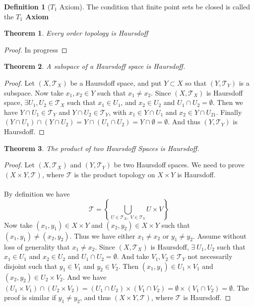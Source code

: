 \documentclass{article}
\newtheorem{theorem}{Theorem}[section]
\theoremstyle{remark}
\theoremstyle{definition}
\newtheorem{definition}{Definition}[section]
\begin{document}
\begin{definition}[$T_1$ Axiom]
The condition that finite point sets be closed is called the \textbf{$T_1$ Axiom}

\end{definition}

\begin{theorem}
Every order topology is Haursdoff
\end{theorem}

\begin{proof}
In progress
\end{proof}

\begin{theorem}
A subspace of a Haursdoff space is Haursdoff.
\end{theorem}

\begin{proof}
Let $(X, \mathcal{T}_X)$ be a Haursdoff space, and put $Y \subset X$ so that $(Y, \mathcal{T}_Y)$ is a subspace. Now take $x_1, x_2 \in Y$ such that $x_1 \neq x_2$. Since $(X, \mathcal{T}_X)$ is Haursdoff space, $\exists U_1, U_2 \in \mathcal{T}_X$ such that $x_1 \in U_1$, and $x_2 \in U_2$ and $U_1 \cap U_2 = \emptyset$. Then we have $Y \cap U_1 \in \mathcal{T}_Y$ and $Y \cap U_2 \in \mathcal{T}_Y$, with $x_1 \in Y \cap U_1$ and $x_2 \in Y \cap U_21$. Finally $( Y \cap U_1) \cap (Y \cap U_2) = Y \cap (U_1 \cap U_2) = Y \cap \emptyset = \emptyset$. And thus $(Y, \mathcal{T}_Y)$ is Haursdoff.
\end{proof}

\medskip

\begin{theorem}
The product of two Haursdoff Spaces is Haursdoff.
\end{theorem}

\begin{proof}
Let $(X, \mathcal{T}_X)$ and $(Y, \mathcal{T}_Y)$ be two Haursdoff spaces. We need to prove $(X \times Y, \mathcal{T})$, where $\mathcal{T}$ is the product topology on $X \times Y$ is Haursdoff. \\ \\ By definition we have $$\mathcal{T} = \left\{\bigcup_{U \in \mathcal{T}_X, \ V \in \mathcal{T}_Y} U \times V \right\}$$ Now take $(x_1, y_1) \in X \times Y$ and $(x_2, y_2) \in X \times Y$ such that $(x_1, y_1) \neq (x_2, y_2)$. Thus we have either $x_1 \neq x_2$ or $y_1 \neq y_2$. Assume without loss of generality that $x_1 \neq x_2$. Since $(X, \mathcal{T}_X)$ is Haursdoff, $\exists \ U_1, U_2$ such that $x_1 \in U_1$ and $x_2 \in U_2$ and $U_1 \cap U_2 = \emptyset$. And take $V_1, V_2 \in \mathcal{T}_Y$ not necessarily disjoint such that $y_1 \in V_1$ and $y_2 \in V_2$. Then $(x_1, y_1) \in U_1 \times V_1$ and $(x_2, y_2) \in U_2 \times V_2$. And we have $(U_1 \times V_1) \cap  (U_2 \times V_2) = (U_1 \cap U_2) \times (V_1 \cap V_2) = \emptyset \times (V_1 \cap V_2) = \emptyset$. The proof is similar if $y_1 \neq y_2$, and thus $(X \times Y, \mathcal{T})$, where $\mathcal{T}$ is Haursdoff.
\end{proof}
\end{document}
